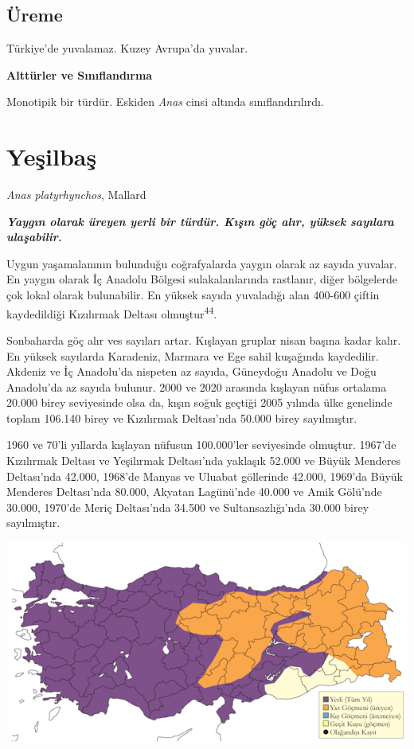 \documentclass[
  letterpaper,
  DIV=11,
  numbers=noendperiod]{scrreprt}
\begin{document}
\hypertarget{uxfcreme-14}{%
\subsection{\texorpdfstring{\textbf{Üreme}}{Üreme}}\label{uxfcreme-14}}

Türkiye'de yuvalamaz. Kuzey Avrupa'da yuvalar.

\textbf{Alttürler ve Sınıflandırma}

Monotipik bir türdür. Eskiden \emph{Anas} cinsi altında
sınıflandırılırdı.

\hypertarget{yeux15filbaux15f}{%
\section{Yeşilbaş}\label{yeux15filbaux15f}}

\emph{Anas platyrhynchos}, Mallard

\textbf{\emph{Yaygın olarak üreyen yerli bir türdür. Kışın göç alır,
yüksek sayılara ulaşabilir.}}

Uygun yaşamalanının bulunduğu coğrafyalarda yaygın olarak az sayıda
yuvalar. En yaygın olarak İç Anadolu Bölgesi sulakalanlarında rastlanır,
diğer bölgelerde çok lokal olarak bulunabilir. En yüksek sayıda
yuvaladığı alan 400-600 çiftin kaydedildiği Kızılırmak Deltası
olmuştur\textsuperscript{44}.

Sonbaharda göç alır ves sayıları artar. Kışlayan gruplar nisan başına
kadar kalır. En yüksek sayılarda Karadeniz, Marmara ve Ege sahil
kuşağında kaydedilir. Akdeniz ve İç Anadolu'da nispeten az sayıda,
Güneydoğu Anadolu ve Doğu Anadolu'da az sayıda bulunur. 2000 ve 2020
arasında kışlayan nüfus ortalama 20.000 birey seviyesinde olsa da, kışın
soğuk geçtiği 2005 yılında ülke genelinde toplam 106.140 birey ve
Kızılırmak Deltası'nda 50.000 birey sayılmıştır.

1960 ve 70'li yıllarda kışlayan nüfusun 100.000'ler seviyesinde
olmuştur. 1967'de Kızılırmak Deltası ve Yeşilırmak Deltası'nda yaklaşık
52.000 ve Büyük Menderes Deltası'nda 42.000, 1968'de Manyas ve Uluabat
göllerinde 42.000, 1969'da Büyük Menderes Deltası'nda 80.000, Akyatan
Lagünü'nde 40.000 ve Amik Gölü'nde 30.000, 1970'de Meriç Deltası'nda
34.500 ve Sultansazlığı'nda 30.000 birey sayılmıştır.

\includegraphics{images/harita_Page_016.png}
\end{document}
